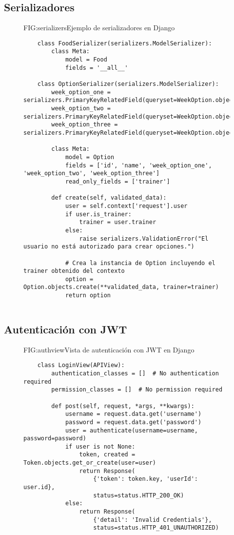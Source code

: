 \subsection{Serializadores}
\begin{figure}[Ejemplo Código Serializadores]{FIG:serializers}{Ejemplo de serializadores en Django}
    \begin{verbatim}
    class FoodSerializer(serializers.ModelSerializer):
        class Meta:
            model = Food
            fields = '__all__'

    class OptionSerializer(serializers.ModelSerializer):
        week_option_one = serializers.PrimaryKeyRelatedField(queryset=WeekOption.objects.all())
        week_option_two = serializers.PrimaryKeyRelatedField(queryset=WeekOption.objects.all())
        week_option_three = serializers.PrimaryKeyRelatedField(queryset=WeekOption.objects.all())

        class Meta:
            model = Option
            fields = ['id', 'name', 'week_option_one', 'week_option_two', 'week_option_three']
            read_only_fields = ['trainer']

        def create(self, validated_data):
            user = self.context['request'].user
            if user.is_trainer:
                trainer = user.trainer
            else:
                raise serializers.ValidationError("El usuario no está autorizado para crear opciones.")

            # Crea la instancia de Option incluyendo el trainer obtenido del contexto
            option = Option.objects.create(**validated_data, trainer=trainer)
            return option
            
    \end{verbatim}
    \end{figure}

\newpage

\subsection{Autenticación con JWT}
\begin{figure}[Vista Autenticación]{FIG:authview}{Vista de autenticación con JWT en Django}
    \begin{verbatim}
    class LoginView(APIView):
        authentication_classes = []  # No authentication required
        permission_classes = []  # No permission required
    
        def post(self, request, *args, **kwargs):
            username = request.data.get('username')
            password = request.data.get('password')
            user = authenticate(username=username, password=password)
            if user is not None:
                token, created = Token.objects.get_or_create(user=user)
                return Response(
                    {'token': token.key, 'userId': user.id}, 
                    status=status.HTTP_200_OK)
            else:
                return Response(
                    {'detail': 'Invalid Credentials'}, 
                    status=status.HTTP_401_UNAUTHORIZED)
    \end{verbatim}
    \end{figure}

